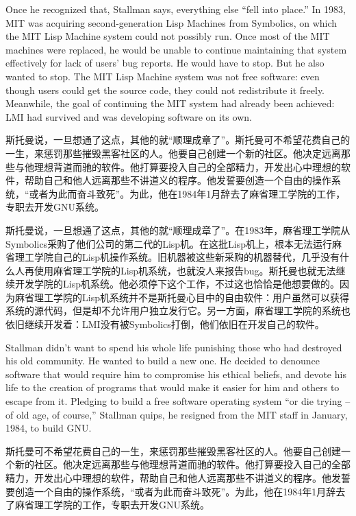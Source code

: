 \ifdefined\vtwo
Once he recognized that, Stallman says, everything else ``fell into place.'' In 1983, MIT was acquiring second-generation Lisp Machines from Symbolics, on which the MIT Lisp Machine system could not possibly run.  Once most of the MIT machines were replaced, he would be unable to continue maintaining that system effectively for lack of users' bug reports.  He would have to stop.  But he also wanted to stop.  The MIT Lisp Machine system was not free software: even though users could get the source code, they could not redistribute it freely.  Meanwhile, the goal of continuing the MIT system had already been achieved: LMI had survived and was developing software on its own.
\fi
\fi

\ifdefined\chs
\ifdefined\vone
斯托曼说，一旦想通了这点，其他的就``顺理成章了''。斯托曼可不希望花费自己的一生，来惩罚那些摧毁黑客社区的人。他要自己创建一个新的社区。他决定远离那些与他理想背道而驰的软件。他打算要投入自己的全部精力，开发出心中理想的软件，帮助自己和他人远离那些不讲道义的程序。他发誓要创造一个自由的操作系统，``或者为此而奋斗致死''。为此，他在1984年1月辞去了麻省理工学院的工作，专职去开发GNU系统。
\fi

\ifdefined\vtwo
斯托曼说，一旦想通了这点，其他的就``顺理成章了''。在1983年，麻省理工学院从Symbolics采购了他们公司的第二代的Lisp机。在这批Lisp机上，根本无法运行麻省理工学院自己的Lisp机操作系统。旧机器被这些新采购的机器替代，几乎没有什么人再使用麻省理工学院的Lisp机系统，也就没人来报告bug。斯托曼也就无法继续开发学院的Lisp机系统。他必须停下这个工作，不过这也恰恰是他想要做的。因为麻省理工学院的Lisp机系统并不是斯托曼心目中的自由软件：用户虽然可以获得系统的源代码，但是却不允许用户独立发行它。另一方面，麻省理工学院的系统也依旧继续开发着：LMI没有被Symbolics打倒，他们依旧在开发自己的软件。
\fi
\fi

\ifdefined\vtwo
\ifdefined\eng
Stallman didn't want to spend his whole life punishing those who had destroyed his old community.  He wanted to build a new one. He decided to denounce software that would require him to compromise his ethical beliefs, and devote his life to the creation of programs that would make it easier for him and others to escape from it. Pledging to build a free software operating system ``or die trying -- of old age, of course,'' Stallman quips, he resigned from the MIT staff in January, 1984, to build GNU.
\fi

\ifdefined\chs
斯托曼可不希望花费自己的一生，来惩罚那些摧毁黑客社区的人。他要自己创建一个新的社区。他决定远离那些与他理想背道而驰的软件。他打算要投入自己的全部精力，开发出心中理想的软件，帮助自己和他人远离那些不讲道义的程序。他发誓要创造一个自由的操作系统，``或者为此而奋斗致死''。为此，他在1984年1月辞去了麻省理工学院的工作，专职去开发GNU系统。
\fi
\fi

